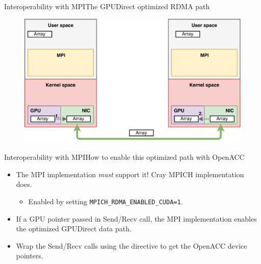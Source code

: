 \documentclass[12pt,aspectratio=169]{beamer}
\newcommand\shinline[2][]{\lstinline[style=shstyle,basicstyle=\ttfamily,#1]!#2!}
\begin{document}
\begin{frame}{Interoperability with MPI}{The GPUDirect optimized RDMA path}
  \begin{figure}
    \centering
    \includegraphics[height=.7\textheight]{rdma_gpudirect}
  \end{figure}
\end{frame}

\begin{frame}{Interoperability with MPI}{How to enable this optimized path with OpenACC}
  \begin{itemize}
  \item The MPI implementation \emph{must} support it! Cray MPICH implementation does.
    \begin{itemize}
    \item Enabled by setting \shinline{MPICH_RDMA_ENABLED_CUDA=1}.
    \end{itemize}
    \vspace\baselineskip
  \item If a GPU pointer passed in Send/Recv call, the MPI implementation enables the optimized GPUDirect data path.
    \pause
    \vspace\baselineskip
  \item Wrap the Send/Recv calls using the  directive to get the OpenACC device pointers.
  \end{itemize}
\end{frame}
\end{document}
